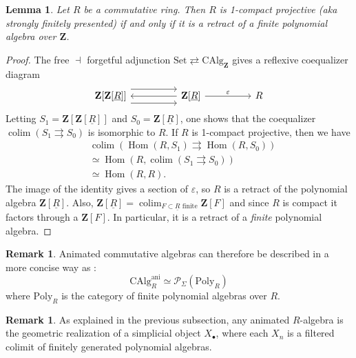 \documentclass[11pt]{article}
\newtheorem{lemma}[theorem]{Lemma}
\theoremstyle{definition}
\newtheorem{remark}[theorem]{Remark}
\newcommand{\ani}{\mathrm{ani}}
\newcommand{\CAlg}{\mathrm{CAlg}}
\newcommand{\colim}{\operatorname*{colim}}
\newcommand{\Hom}{\operatorname{Hom}}
\renewcommand{\P}{\mathcal{P}}
\newcommand{\Poly}{\mathrm{Poly}}
\newcommand{\Set}{\mathrm{Set}}
\newcommand{\Z}{\mathbf{Z}}
\begin{document}
\begin{lemma}
    Let $R$ be a commutative ring.
    Then $R$ is 1-compact projective (aka strongly finitely presented) if and only if it is a retract of a finite polynomial algebra over $\Z$.
\end{lemma}
\begin{proof}
    The free $\dashv$ forgetful adjunction $\Set \rightleftarrows \CAlg_{\Z}$ gives a reflexive coequalizer diagram
    \[\begin{tikzcd}
        {\Z[\Z[\underline{R}]]} && {\Z[\underline{R}]} && R
        \arrow[shift left=3, from=1-1, to=1-3]
        \arrow[shift right=3, from=1-1, to=1-3]
        \arrow[from=1-3, to=1-1]
        \arrow["\varepsilon", from=1-3, to=1-5]
    \end{tikzcd}\]
    Letting $S_1 = \Z[\Z[\underline{R}]]$ and $S_0 = \Z[\underline{R}]$, one shows that the coequalizer $\colim(S_1 \rightrightarrows S_0)$ is isomorphic to $R$.
    If $R$ is 1-compact projective, then we have
    \begin{align*}
        &\colim(\Hom(R, S_1) \rightrightarrows \Hom(R, S_0))\\
        &\simeq \Hom(R, \colim(S_1 \rightrightarrows S_0))\\
        &\simeq \Hom(R, R).
    \end{align*}
    The image of the identity gives a section of $\varepsilon$, so $R$ is a retract of the polynomial algebra $\Z[\underline{R}]$.
    Also, $\Z[\underline{R}] = \colim_{F \subset \underline{R}\text{ finite}}\Z[F]$ and since $R$ is compact it factors through a $\Z[F]$. In particular, it is a retract of a \emph{finite} polynomial algebra.
\end{proof}

\begin{remark}
    Animated commutative algebras can therefore be described in a more concise way as :
    \[
        \CAlg_R^{\ani} \simeq \P_{\Sigma}(\Poly_R)
    \]
    where $\Poly_R$ is the category of finite polynomial algebras over $R$.
\end{remark}

\begin{remark}
    As explained in the previous subsection, any animated $R$-algebra is the geometric realization of a simplicial object $X_{\bullet}$, where each $X_n$ is a filtered colimit of finitely generated polynomial algebras.
\end{remark}
\end{document}

